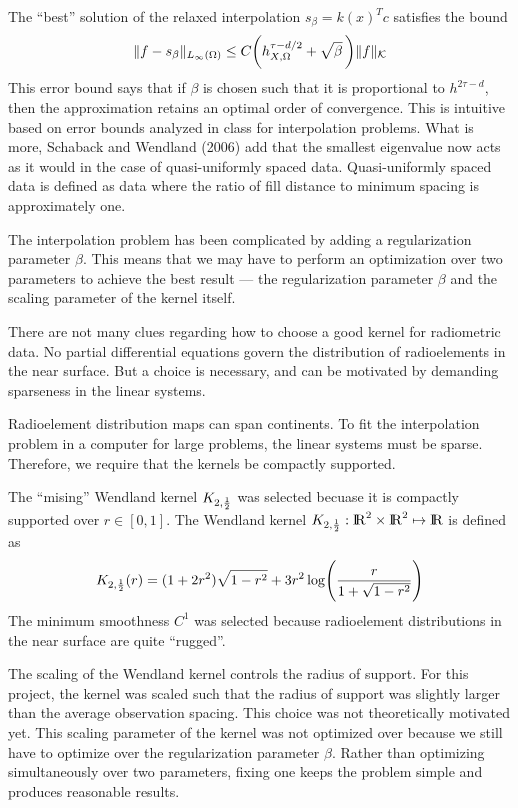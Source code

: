 \medskip
The ``best'' solution of the relaxed interpolation $s_\beta = k(x)^T c$ satisfies the bound
$$\| f - s_\beta \|_{L_\infty(\Omega)} \leq C \biggl( h^{\tau - d / 2}_{X, \Omega} + \sqrt{\beta}\,\biggr) \|f\|_{\cal K}$$
This error bound says that if $\beta$ is chosen such that it is proportional to $h^{2\tau - d}$, then the approximation retains an optimal order of convergence.
This is intuitive based on error bounds analyzed in class for interpolation problems.
What is more, Schaback and Wendland (2006) add that the smallest eigenvalue now acts as it would in the case of quasi-uniformly spaced data.
Quasi-uniformly spaced data is defined as data where the ratio of fill distance to minimum spacing is approximately one.

\medskip
The interpolation problem has been complicated by adding a regularization parameter $\beta$.
This means that we may have to perform an optimization over two parameters to achieve the best result --- the regularization parameter $\beta$ and the scaling parameter of the kernel itself.

\bigskip
{}
There are not many clues regarding how to choose a good kernel for radiometric data.
No partial differential equations govern the distribution of radioelements in the near surface.
But a choice is necessary, and can be motivated by demanding sparseness in the linear systems.

\medskip
Radioelement distribution maps can span continents.
To fit the interpolation problem in a computer for large problems, the linear systems must be sparse.
Therefore, we require that the kernels be compactly supported.

\medskip
The ``mising'' Wendland kernel $K_{2, {1 \over 2}}$ was selected becuase it is compactly supported over $r \in [0, 1]$.
The Wendland kernel $K_{2, {1 \over 2}} : {\rm I \kern -2pt R}^2 \times {\rm I \kern -2pt R}^2 \mapsto {\rm I \kern -2pt R}$ is defined as
$$K_{2, {1 \over 2}}(r) = (1 + 2 r^2) \sqrt{1 - r^2} + 3 r^2 \log\Biggl( {r \over 1 + \sqrt{1 - r^2}}\Biggr) $$
The minimum smoothness $C^1$ was selected because radioelement distributions in the near surface are quite ``rugged''.

\medskip
The scaling of the Wendland kernel controls the radius of support.
For this project, the kernel was scaled such that the radius of support was slightly larger than the average observation spacing.
This choice was not theoretically motivated yet.
This scaling parameter of the kernel was not optimized over because we still have to optimize over the regularization parameter $\beta$.
Rather than optimizing simultaneously over two parameters, fixing one keeps the problem simple and produces reasonable results.

